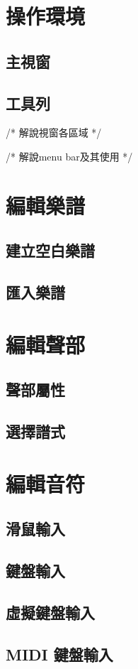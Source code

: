 \documentclass[12pt,a4paper,oneside]{report}
\begin{document}
\section{操作環境}
\subsection{主視窗}
\subsection{工具列}
/* 
解說視窗各區域
*/

/* 
解說menu bar及其使用
*/
\section{編輯樂譜}
   \subsection{建立空白樂譜}
   \subsection{匯入樂譜}
\section{編輯聲部}
   \subsection{聲部屬性}
   \subsection{選擇譜式}
\section{編輯音符}
   \subsection{滑鼠輸入}
   \subsection{鍵盤輸入}
   \subsection{虛擬鍵盤輸入}
   \subsection{MIDI 鍵盤輸入}
\end{document}
